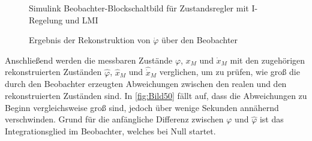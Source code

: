 \begin{figure}[H]
    \centering
    \caption[Beobachter Simulink]{Simulink Beobachter-Blockschaltbild für Zustandsregler mit I-Regelung und LMI}
    \label{fig:Bild48}
\end{figure}

\begin{figure}[H]
    \centering
    \caption[Rekonstruktion $\dot{\varphi}$]{Ergebnis der Rekonstruktion von $\dot{\varphi}$ über den Beobachter}
    \label{fig:Bild49}
\end{figure}

Anschließend werden die messbaren Zustände $\varphi$, $x_M$ und $\dot{x}_M$ mit den zugehörigen rekonstruierten Zuständen $\hat{\varphi}$, $\hat{x}_M$ und $\hat{\dot{x}}_M$ verglichen, um zu prüfen, wie groß die durch den Beobachter erzeugten Abweichungen zwischen den realen und den rekonstruierten Zuständen sind. In \autoref{fig:Bild50} fällt auf, dass die Abweichungen zu Beginn vergleichsweise groß sind, jedoch über wenige Sekunden annähernd verschwinden. Grund für die anfängliche Differenz zwischen $\varphi$ und $\hat{\varphi}$ ist das Integrationsglied im Beobachter, welches bei Null startet. 

